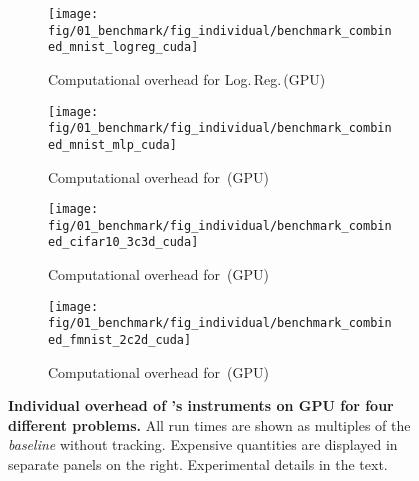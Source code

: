 \captionsetup[subfigure]{justification=justified,singlelinecheck=false}

\begin{figure}[p]
	\vfill
	\begin{subfigure}[t]{0.99\textwidth}
		\caption{\qquad Computational overhead for \mnist Log.\,Reg.\,(GPU)}
		\texttt{[image: fig/01\_benchmark/fig\_individual/benchmark\_combined\_mnist\_logreg\_cuda]}
		\label{fig:app_benchmark_instruments_cuda-mnist_logreg}
		\vspace{0.5cm}
	\end{subfigure}
	\vfill
	\begin{subfigure}[t]{0.99\textwidth}
		\caption{\qquad Computational overhead for \mnist \mlp\,(GPU)}
		\texttt{[image: fig/01\_benchmark/fig\_individual/benchmark\_combined\_mnist\_mlp\_cuda]}
		\label{fig:app_benchmark_instruments_cuda-mnist_mlp}
		\vspace{0.5cm}
	\end{subfigure}
	\vfill
	\begin{subfigure}[t]{0.99\textwidth}
		\caption{\qquad Computational overhead for \cifarten \threecthreed\,(GPU)}
		\texttt{[image: fig/01\_benchmark/fig\_individual/benchmark\_combined\_cifar10\_3c3d\_cuda]}
		\label{fig:app_benchmark_instruments_cuda-cifar10}
		\vspace{0.5cm}
	\end{subfigure}
	\vfill
	\begin{subfigure}[t]{0.99\textwidth}
		\caption{\qquad Computational overhead for \fmnist \twoctwod\,(GPU)}
		\texttt{[image: fig/01\_benchmark/fig\_individual/benchmark\_combined\_fmnist\_2c2d\_cuda]}
		\label{fig:app_benchmark_instruments_cuda-fmnist}
		\vspace{0.5cm}
	\end{subfigure}
	\vfill
	\caption{\textbf{Individual overhead of \cockpittitle's instruments on GPU for
		four different problems.} All run times are shown as multiples of
	the \emph{baseline} without tracking. Expensive quantities are displayed in
	separate panels on the right. Experimental details in the text.}
	\label{fig:app_benchmark_instruments_cuda}
\end{figure}

\captionsetup[subfigure]{justification=centering, singlelinecheck=true}


